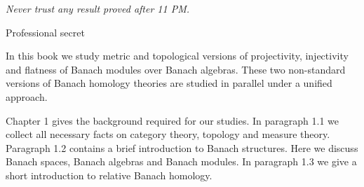 \documentclass[11pt, a4paper, oneside]{thbook}
\begin{document}
\pagestyle{empty} 

\null\vfill 

\textit{Never trust any result proved after 11 PM.}

\begin{flushright}
Professional secret
\end{flushright}

\vfill\vfill\vfill\vfill\vfill\vfill\null{}

\clearpage %




In this book we study metric and topological versions of projectivity,
injectivity and flatness of Banach modules over Banach algebras. These two 
non-standard versions of Banach homology theories are studied in parallel under
a unified approach.

Chapter 1 gives the background required for our studies. In paragraph 1.1 we collect
all necessary facts on category theory, topology and measure theory. Paragraph
1.2 contains a brief introduction to Banach structures. Here we discuss Banach
spaces, Banach algebras and Banach modules. In paragraph 1.3 we give a short
introduction to relative Banach homology. 
\end{document}
